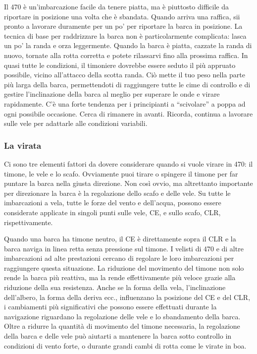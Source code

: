Il 470 è un'imbarcazione facile da tenere piatta, ma è piuttosto difficile da
riportare in posizione una volta che è sbandata. Quando arriva una raffica, sii
pronto a lavorare duramente per un po' per riportare la barca in posizione. La
tecnica di base per raddrizzare la barca non è particolarmente complicata: lasca
un po' la randa e orza leggermente. Quando la barca è piatta, cazzate la randa
di nuovo, tornate alla rotta corretta e potete rilassarvi fino alla prossima
raffica. In quasi tutte le condizioni, il timoniere dovrebbe essere seduto il
più appruato possibile, vicino all'attacco della scotta randa. Ciò mette il tuo
peso nella parte più larga della barca, permettendoti di raggiungere tutte le
cime di controllo e di gestire l'inclinazione della barca al meglio per superare
le onde e virare rapidamente. C'è una forte tendenza per i principianti a
``scivolare'' a poppa ad ogni possibile occasione. Cerca di rimanere in avanti.
Ricorda, continua a lavorare sulle vele per adattarle alle condizioni variabili.

\subsubsection{La virata}
\label{subsubsec:LaVirata}
Ci sono tre elementi fattori da dovere considerare quando si vuole virare in
470: il timone, le vele e lo scafo. Ovviamente puoi tirare o spingere il timone
per far puntare la barca nella giusta direzione. Non così ovvio, ma altrettanto
importante per direzionare la barca è la regolazione dello scafo e delle vele.
Su tutte le imbarcazioni a vela, tutte le forze del vento e dell'acqua, possono
essere considerate applicate in singoli punti sulle vele, \ac{CE}, e sullo
scafo, \ac{CLR}, rispettivamente.

Quando una barca ha timone neutro, il \ac{CE} è direttamente sopra il \ac{CLR} e
la barca naviga in linea retta senza pressione sul timone. I velisti di 470 e di
altre imbarcazioni ad alte prestazioni cercano di regolare le loro imbarcazioni
per raggiungere questa situazione. La riduzione del movimento del timone non
solo rende la barca più reattiva, ma la rende effettivamente più veloce grazie
alla riduzione della sua resistenza. Anche se la forma della vela,
l'inclinazione dell'albero, la forma della deriva ecc., influenzano la posizione
del \ac{CE} e del \ac{CLR}, i cambiamenti più significativi che possono essere
effettuati durante la navigazione riguardano la regolazione delle vele e lo
sbandamento della barca. Oltre a ridurre la quantità di movimento del timone
necessaria, la regolazione della barca e delle vele può aiutarti a mantenere la
barca sotto controllo in condizioni di vento forte, o durante grandi cambi di
rotta come le virate in boa.

